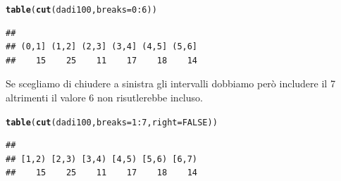 \documentclass[onecolumn,12pt]{book}\usepackage[]{graphicx}\usepackage[]{color}
\makeatletter
\newcommand{\hlnum}[1]{\textcolor[rgb]{0.686,0.059,0.569}{#1}}%
\newcommand{\hlopt}[1]{\textcolor[rgb]{0,0,0}{#1}}%
\newcommand{\hlstd}[1]{\textcolor[rgb]{0.345,0.345,0.345}{#1}}%
\newcommand{\hlkwc}[1]{\textcolor[rgb]{0.333,0.667,0.333}{#1}}%
\newcommand{\hlkwd}[1]{\textcolor[rgb]{0.737,0.353,0.396}{\textbf{#1}}}%
\newenvironment{kframe}{%
 \def\at@end@of@kframe{}%
 \ifinner\ifhmode%
  \def\at@end@of@kframe{\end{minipage}}%
  \begin{minipage}{\columnwidth}%
 \fi\fi%
 \def\FrameCommand##1{\hskip\@totalleftmargin \hskip-\fboxsep
 \colorbox{shadecolor}{##1}\hskip-\fboxsep
     \hskip-\linewidth \hskip-\@totalleftmargin \hskip\columnwidth}%
 \MakeFramed {\advance\hsize-\width
   \@totalleftmargin\z@ \linewidth\hsize
   \@setminipage}}%
 {\par\unskip\endMakeFramed%
 \at@end@of@kframe}
\newenvironment{knitrout}{}{} %
\makeatother
\begin{document}
\begin{knitrout}
\color{fgcolor}\begin{kframe}
\begin{alltt}
\hlkwd{table}\hlstd{(}\hlkwd{cut}\hlstd{(dadi100,}\hlkwc{breaks}\hlstd{=}\hlnum{0}\hlopt{:}\hlnum{6}\hlstd{))}
\end{alltt}
\begin{verbatim}
## 
## (0,1] (1,2] (2,3] (3,4] (4,5] (5,6] 
##    15    25    11    17    18    14
\end{verbatim}
\end{kframe}
\end{knitrout}
Se scegliamo di chiudere a sinistra gli intervalli dobbiamo però includere il 7 altrimenti 
il valore 6 non risutlerebbe incluso.
\begin{knitrout}
\color{fgcolor}\begin{kframe}
\begin{alltt}
\hlkwd{table}\hlstd{(}\hlkwd{cut}\hlstd{(dadi100,}\hlkwc{breaks}\hlstd{=} \hlnum{1}\hlopt{:}\hlnum{7}\hlstd{,}\hlkwc{right}\hlstd{=}\hlnum{FALSE}\hlstd{))}
\end{alltt}
\begin{verbatim}
## 
## [1,2) [2,3) [3,4) [4,5) [5,6) [6,7) 
##    15    25    11    17    18    14
\end{verbatim}
\end{kframe}
\end{knitrout}
\end{document}
